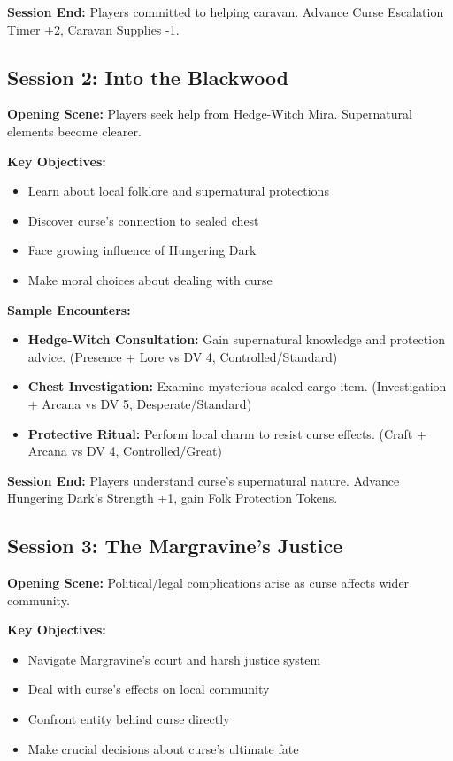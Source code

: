 \documentclass[11pt]{article}
\begin{document}
\textbf{Session End:} Players committed to helping caravan. Advance Curse Escalation Timer +2, Caravan Supplies -1.

\subsection{Session 2: Into the Blackwood}

\textbf{Opening Scene:} Players seek help from Hedge-Witch Mira. Supernatural elements become clearer.

\textbf{Key Objectives:}
\begin{itemize}
\item Learn about local folklore and supernatural protections
\item Discover curse's connection to sealed chest
\item Face growing influence of Hungering Dark
\item Make moral choices about dealing with curse
\end{itemize}

\textbf{Sample Encounters:}
\begin{itemize}
\item \textbf{Hedge-Witch Consultation:} Gain supernatural knowledge and protection advice. (Presence + Lore vs DV 4, Controlled/Standard)
\item \textbf{Chest Investigation:} Examine mysterious sealed cargo item. (Investigation + Arcana vs DV 5, Desperate/Standard)
\item \textbf{Protective Ritual:} Perform local charm to resist curse effects. (Craft + Arcana vs DV 4, Controlled/Great)
\end{itemize}

\textbf{Session End:} Players understand curse's supernatural nature. Advance Hungering Dark's Strength +1, gain Folk Protection Tokens.

\subsection{Session 3: The Margravine's Justice}

\textbf{Opening Scene:} Political/legal complications arise as curse affects wider community.

\textbf{Key Objectives:}
\begin{itemize}
\item Navigate Margravine's court and harsh justice system
\item Deal with curse's effects on local community
\item Confront entity behind curse directly
\item Make crucial decisions about curse's ultimate fate
\end{itemize}
\end{document}
